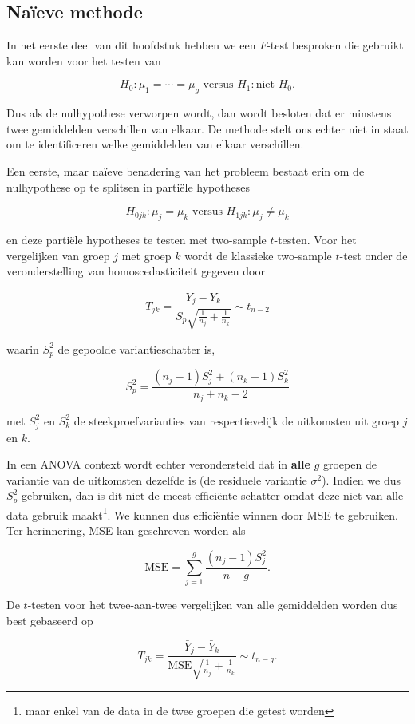 \documentclass[
  dutch,
  letterpaper,
  12pt]{book}
\theoremstyle{definition}
\theoremstyle{definition}
\theoremstyle{definition}
\theoremstyle{remark}
\begin{document}
\subsection{Naïeve methode}\label{nauxefeve-methode}

In het eerste deel van dit hoofdstuk hebben we een \(F\)-test besproken
die gebruikt kan worden voor het testen van

\[  H_0: \mu_1=\cdots = \mu_g \text{ versus } H_1: \text{niet } H_0.\]

Dus als de nulhypothese verworpen wordt, dan wordt besloten dat er
minstens twee gemiddelden verschillen van elkaar. De methode stelt ons
echter niet in staat om te identificeren welke gemiddelden van elkaar
verschillen.

Een eerste, maar naïeve benadering van het probleem bestaat erin om de
nulhypothese op te splitsen in partiële hypotheses

\[H_{0jk}: \mu_j=\mu_k \text{ versus } H_{1jk}: \mu_j \neq \mu_k\]

en deze partiële hypotheses te testen met two-sample \(t\)-testen. Voor
het vergelijken van groep \(j\) met groep \(k\) wordt de klassieke
two-sample \(t\)-test onder de veronderstelling van homoscedasticiteit
gegeven door

\[T_{jk} = \frac{\bar{Y}_j-\bar{Y}_k}{S_p\sqrt{\frac{1}{n_j}+\frac{1}{n_k}}} \sim t_{n-2}\]

waarin \(S_p^2\) de gepoolde variantieschatter is,

\[S_p^2 = \frac{(n_j-1)S_j^2 + (n_k-1)S_k^2}{n_j+n_k-2}\]

met \(S_j^2\) en \(S_k^2\) de steekproefvarianties van respectievelijk
de uitkomsten uit groep \(j\) en \(k\).

In een ANOVA context wordt echter verondersteld dat in \textbf{alle}
\(g\) groepen de variantie van de uitkomsten dezelfde is (de residuele
variantie \(\sigma^2\)). Indien we dus \(S_p^2\) gebruiken, dan is dit
niet de meest efficiënte schatter omdat deze niet van alle data gebruik
maakt\footnote{maar enkel van de data in de twee groepen die getest
  worden}. We kunnen dus efficiëntie winnen door MSE te gebruiken. Ter
herinnering, MSE kan geschreven worden als

\[\text{MSE}= \sum_{j=1}^g \frac{(n_j-1)S_j^2}{n-g}.\]

De \(t\)-testen voor het twee-aan-twee vergelijken van alle gemiddelden
worden dus best gebaseerd op

\[T_{jk} = \frac{\bar{Y}_j-\bar{Y}_k}{\text{MSE}\sqrt{\frac{1}{n_j}+\frac{1}{n_k}}} \sim t_{n-g}.\]
\end{document}
